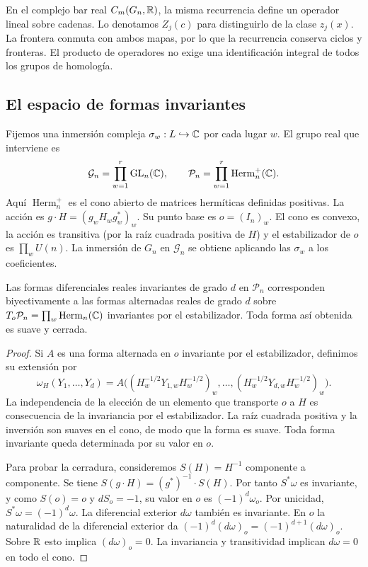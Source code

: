 En el complejo bar real $C_m(G_n,\mathbb{R})$, la misma recurrencia define un operador lineal sobre cadenas. Lo denotamos $Z_j(c)$ para distinguirlo de la clase $z_j(x)$. La frontera conmuta con ambos mapas, por lo que la recurrencia conserva ciclos y fronteras. El producto de operadores no exige una identificación integral de todos los grupos de homología.

\subsection{El espacio de formas invariantes}

Fijemos una inmersión compleja $\sigma_w:L\hookrightarrow\mathbb{C}$ por cada lugar $w$. El grupo real que interviene es
\[
 \mathcal G_n=\prod_{w=1}^r\operatorname{GL}_n(\mathbb{C}),\qquad
 \mathcal P_n=\prod_{w=1}^r\operatorname{Herm}_n^+(\mathbb{C}).
\]
Aquí $\operatorname{Herm}_n^+$ es el cono abierto de matrices hermíticas definidas positivas. La acción es $g\cdot H=(g_wH_wg_w^*)_w$. Su punto base es $o=(I_n)_w$. El cono es convexo, la acción es transitiva (por la raíz cuadrada positiva de $H$) y el estabilizador de $o$ es $\prod_w U(n)$. La inmersión de $G_n$ en $\mathcal G_n$ se obtiene aplicando las $\sigma_w$ a los coeficientes.

\begin{proposicion}
\label{prop:dr-ext}
Las formas diferenciales reales invariantes de grado $d$ en $\mathcal P_n$ corresponden biyectivamente a las formas alternadas reales de grado $d$ sobre $T_o\mathcal P_n=\prod_w\operatorname{Herm}_n(\mathbb{C})$ invariantes por el estabilizador. Toda forma así obtenida es suave y cerrada.
\end{proposicion}
\begin{proof}
Si $A$ es una forma alternada en $o$ invariante por el estabilizador, definimos su extensión por
\begin{equation}
 \omega_H(Y_1,\ldots,Y_d)=A\bigl((H_w^{-1/2}Y_{1,w}H_w^{-1/2})_w,\ldots,
 (H_w^{-1/2}Y_{d,w}H_w^{-1/2})_w\bigr).
 \label{eq:dr-extension}
\end{equation}
La independencia de la elección de un elemento que transporte $o$ a $H$ es consecuencia de la invariancia por el estabilizador. La raíz cuadrada positiva y la inversión son suaves en el cono, de modo que la forma es suave. Toda forma invariante queda determinada por su valor en $o$.

Para probar la cerradura, consideremos $S(H)=H^{-1}$ componente a componente. Se tiene $S(g\cdot H)=(g^*)^{-1}\cdot S(H)$. Por tanto $S^*\omega$ es invariante, y como $S(o)=o$ y $dS_o=-1$, su valor en $o$ es $(-1)^d\omega_o$. Por unicidad, $S^*\omega=(-1)^d\omega$. La diferencial exterior $d\omega$ también es invariante. En $o$ la naturalidad de la diferencial exterior da $(-1)^d(d\omega)_o=(-1)^{d+1}(d\omega)_o$. Sobre $\mathbb{R}$ esto implica $(d\omega)_o=0$. La invariancia y transitividad implican $d\omega=0$ en todo el cono.
\end{proof}

